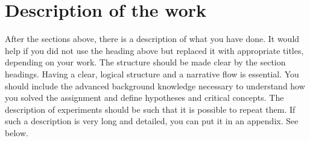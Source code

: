 \section{Description of the work}

After the sections above, there is a description of what you have done. It would help if you did not use the heading above but replaced it with appropriate titles, depending on your work. The structure should be made clear by the section headings. Having a clear, logical structure and a narrative flow is essential. You should include the advanced background knowledge necessary to understand how you solved the assignment and define hypotheses and critical concepts. The description of experiments should be such that it is possible to repeat them. If such a description is very long and detailed, you can put it in an appendix. See below.  